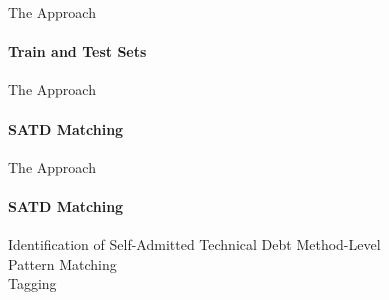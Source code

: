 \documentclass{beamer}
\begin{document}
\begin{darkframes}
		    \begin{frame}{The Approach}
		    	\framesubtitle{Train and Test Sets}
		    	\begin{figure}[t]
		    		\centering
		    	\end{figure}
	    	\end{frame}
    	
    		\begin{frame}{The Approach}
	    		\framesubtitle{SATD Matching}
	    		\begin{figure}[t]
	    			\centering
	    		\end{figure}
    		\end{frame}
    	
    		\begin{frame}{The Approach}
				\framesubtitle{SATD Matching}    	
				\begin{block}{Identification of Self-Admitted Technical Debt}
					Method-Level\\
					Pattern Matching\\
    				Tagging
    			\end{block}
    		\end{frame}
    	

\end{darkframes}
\end{document}
